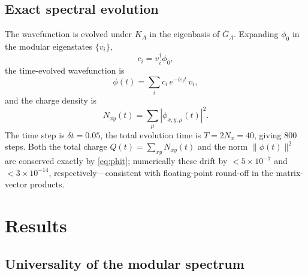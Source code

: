 \documentclass[aps,prb,twocolumn,superscriptaddress,floatfix]{revtex4-2}
\newcommand{\Nx}{N_x}
\newcommand{\hmod}{K_A}
\newcommand{\Nxy}{N_{xy}}
\begin{document}
\subsection{Exact spectral evolution}

The wavefunction is evolved under $\hmod$ in the eigenbasis of $\overline{G}_A$.
Expanding $\phi_0$ in the modular eigenstates $\{v_i\}$,
\begin{equation}
  c_i = v_i^\dagger \phi_0,
\end{equation}
the time-evolved wavefunction is
\begin{equation}
  \phi(t) = \sum_i c_i\, e^{-i\varepsilon_i t}\, v_i,
  \label{eq:phit}
\end{equation}
and the charge density is
\begin{equation}
  \Nxy(t) = \sum_\mu |\phi_{x,y,\mu}(t)|^2.
\end{equation}
The time step is $\delta t = 0.05$, the total evolution time is
$T = 2\Nx = 40$, giving 800 steps.  Both the total charge $Q(t) = \sum_{xy}
\Nxy(t)$ and the norm $\|\phi(t)\|^2$ are conserved exactly by
\eqref{eq:phit}; numerically these drift by $< 5 \times 10^{-7}$ and
$< 3 \times 10^{-14}$, respectively—consistent with floating-point
round-off in the matrix-vector products.

\section{Results}
\label{sec:results}

\subsection{Universality of the modular spectrum}
\end{document}
